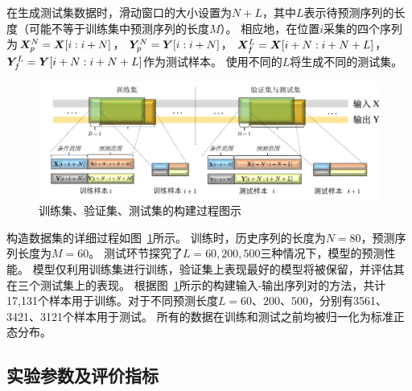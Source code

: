 在生成测试集数据时，滑动窗口的大小设置为$N+L$，其中$L$表示待预测序列的长度（可能不等于训练集中预测序列的长度$M$）。
相应地，在位置$i$采集的四个序列为$\boldsymbol X _p^N =\boldsymbol X[i:i+N]$， $\boldsymbol Y _p^N =\boldsymbol Y[i:i+N]$， $\boldsymbol X _f^L=\boldsymbol X[i+N:i+N+L]$， $\boldsymbol Y _f^L=\boldsymbol Y[i+N:i+N+L]$作为测试样本。
使用不同的$L$将生成不同的测试集。

\begin{figure}[t]
    \centering
    \includegraphics[width=\linewidth]{figures/chapter3/dataset.pdf}
    \caption{
    训练集、验证集、测试集的构建过程图示
    }
    \label{fig:dataset}
\end{figure}


构造数据集的详细过程如图~\ref{fig:dataset}所示。
训练时，历史序列的长度为$N=80$，预测序列长度为$M=60$。
测试环节探究了$L=60, 200, 500$三种情况下，模型的预测性能。
模型仅利用训练集进行训练，验证集上表现最好的模型将被保留，并评估其在三个测试集上的表现。
根据图~\ref{fig:dataset}所示的构建输入-输出序列对的方法，共计17,131个样本用于训练。对于不同预测长度$L=60、200、500$，分别有3561、3421、3121个样本用于测试。
所有的数据在训练和测试之前均被归一化为标准正态分布。

\subsection{实验参数及评价指标}


